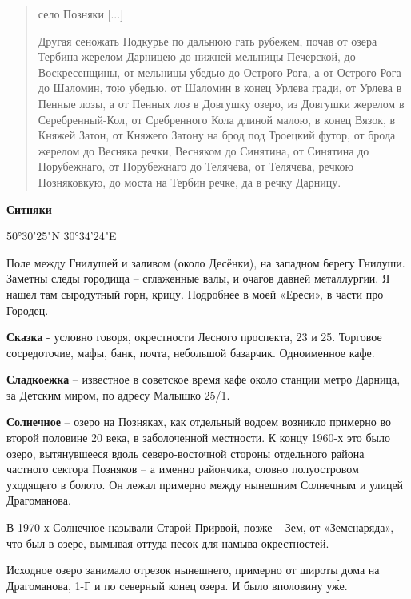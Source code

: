 \begin{quotation}
село Позняки [...]

Другая сеножать Подкурье по дальнюю гать рубежем, почав от озера Тербина жерелом Дарницею до нижней мельницы Печерской, до Воскресенщины, от мельницы убедью до Ост\-рого Рога, а от Острого Рога до Шаломин, тою убедью, от Шаломин в конец Урлева гради, от Урлева в Пенные лозы, а от Пенных лоз в Довгушку озеро, из Довгушки жерелом в Серебренный-Кол, от Сребренного Кола длиной малою, в конец Вязок, в Княжей Затон, от Княжего Затону на брод под Троецкий футор, от брода жерелом до Весняка речки, Весняком до Синятина, от Синятина до Порубежнаго, от Порубежнаго до Телячева, от Телячева, речкою Позняковкую, до моста на Тербин речке, да в речку Дарницу.
\end{quotation}

\medskip

\textbf{Ситняки} 

50°30'25"N   30°34'24"E

Поле между Гнилушей и заливом (около Десёнки), на западном берегу Гнилуши. Заметны следы городища – сглаженные валы, и очагов давней металлургии. Я нашел там сыродутный горн, крицу. Подробнее в моей «Ереси», в части про Городец.\\

\medskip

\textbf{Сказка} - условно говоря, окрестности Лесного проспекта, 23 и 25. Торговое сосредоточие, мафы, банк, почта, небольшой базарчик. Одноименное кафе.\\

\medskip

\textbf{Сладкоежка} – известное в советское время кафе около станции метро Дарница, за Детским миром, по адресу Малышко 25/1.\\

\medskip

\textbf{Солнечное} – озеро на Позняках, как отдельный водоем возникло примерно во второй половине 20 века, в заболоченной местности. К концу 1960-х это было озеро, вытянувшееся вдоль северо-восточной стороны отдельного района частного сектора Позняков – а именно райончика, словно полуостровом уходящего в болото. Он лежал примерно между нынешним Солнечным и улицей Драгоманова.

В 1970-х Солнечное называли Старой Прирвой, позже – Зем, от «Земснаряда», что был в озере, вымывая оттуда песок для намыва окрестностей.

Исходное озеро занимало отрезок нынешнего, примерно от широты дома на Драгоманова, 1-Г и по северный конец озера. И было вполовину у\'же.\\

